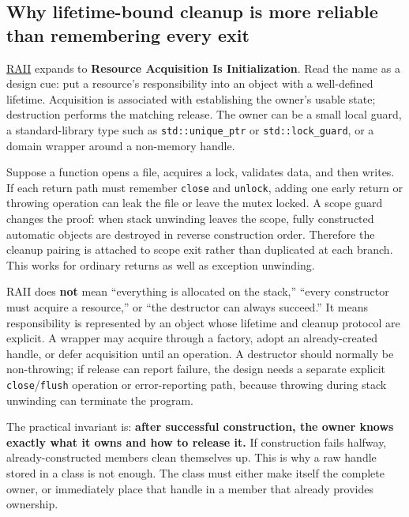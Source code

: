 \subsection{Why lifetime-bound cleanup is more reliable than remembering every exit}\label{01-foundations-i-ch004-why-lifetime-bound-cleanup-is-more-reliable-than-remembering-every-exit}

\hyperref[appendix-69739d3ab49b]{RAII} expands to \textbf{Resource Acquisition Is Initialization}. Read the name as a design cue: put a resource's responsibility into an object with a well-defined lifetime. Acquisition is associated with establishing the owner's usable state; destruction performs the matching release. The owner can be a small local guard, a standard-library type such as \texttt{std::unique\_ptr} or \texttt{std::lock\_guard}, or a domain wrapper around a non-memory handle.

Suppose a function opens a file, acquires a lock, validates data, and then writes. If each return path must remember \texttt{close} and \texttt{unlock}, adding one early return or throwing operation can leak the file or leave the mutex locked. A scope guard changes the proof: when stack unwinding leaves the scope, fully constructed automatic objects are destroyed in reverse construction order. Therefore the cleanup pairing is attached to scope exit rather than duplicated at each branch. This works for ordinary returns as well as exception unwinding.

RAII does \textbf{not} mean ``everything is allocated on the stack,'' ``every constructor must acquire a resource,'' or ``the destructor can always succeed.'' It means responsibility is represented by an object whose lifetime and cleanup protocol are explicit. A wrapper may acquire through a factory, adopt an already-created handle, or defer acquisition until an operation. A destructor should normally be non-throwing; if release can report failure, the design needs a separate explicit \texttt{close}/\texttt{flush} operation or error-reporting path, because throwing during stack unwinding can terminate the program.

The practical invariant is: \textbf{after successful construction, the owner knows exactly what it owns and how to release it.} If construction fails halfway, already-constructed members clean themselves up. This is why a raw handle stored in a class is not enough. The class must either make itself the complete owner, or immediately place that handle in a member that already provides ownership.

